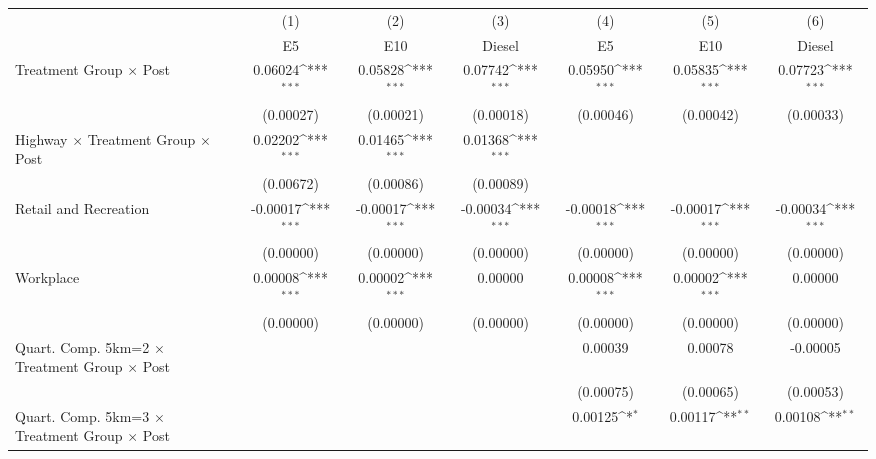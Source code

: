 {
\def\sym#1{\ifmmode^{#1}\else\(^{#1}\)\fi}
\begin{tabular}{l*{6}{c}}
\toprule
                    &\multicolumn{1}{c}{(1)}&\multicolumn{1}{c}{(2)}&\multicolumn{1}{c}{(3)}&\multicolumn{1}{c}{(4)}&\multicolumn{1}{c}{(5)}&\multicolumn{1}{c}{(6)}\\
                    &\multicolumn{1}{c}{E5}&\multicolumn{1}{c}{E10}&\multicolumn{1}{c}{Diesel}&\multicolumn{1}{c}{E5}&\multicolumn{1}{c}{E10}&\multicolumn{1}{c}{Diesel}\\
\midrule
Treatment Group $\times$ Post&     0.06024\sym{***}&     0.05828\sym{***}&     0.07742\sym{***}&     0.05950\sym{***}&     0.05835\sym{***}&     0.07723\sym{***}\\
                    &   (0.00027)         &   (0.00021)         &   (0.00018)         &   (0.00046)         &   (0.00042)         &   (0.00033)         \\
Highway $\times$ Treatment Group $\times$ Post&     0.02202\sym{***}&     0.01465\sym{***}&     0.01368\sym{***}&                     &                     &                     \\
                    &   (0.00672)         &   (0.00086)         &   (0.00089)         &                     &                     &                     \\
Retail and Recreation&    -0.00017\sym{***}&    -0.00017\sym{***}&    -0.00034\sym{***}&    -0.00018\sym{***}&    -0.00017\sym{***}&    -0.00034\sym{***}\\
                    &   (0.00000)         &   (0.00000)         &   (0.00000)         &   (0.00000)         &   (0.00000)         &   (0.00000)         \\
Workplace           &     0.00008\sym{***}&     0.00002\sym{***}&     0.00000         &     0.00008\sym{***}&     0.00002\sym{***}&     0.00000         \\
                    &   (0.00000)         &   (0.00000)         &   (0.00000)         &   (0.00000)         &   (0.00000)         &   (0.00000)         \\
Quart. Comp. 5km=2 $\times$ Treatment Group $\times$ Post&                     &                     &                     &     0.00039         &     0.00078         &    -0.00005         \\
                    &                     &                     &                     &   (0.00075)         &   (0.00065)         &   (0.00053)         \\
Quart. Comp. 5km=3 $\times$ Treatment Group $\times$ Post&                     &                     &                     &     0.00125\sym{*}  &     0.00117\sym{**} &     0.00108\sym{**} \\

\end{tabular}}
